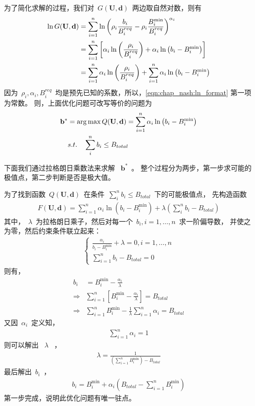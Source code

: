 为了简化求解的过程，我们对~$G(\mathbf{U}, \mathbf{d})$~两边取自然对数，则有
\begin{align}
    \ln G(\mathbf{U}, \mathbf{d}) &= \sum_{i=1}^{n} \ln \left(\rho_i \frac{b_i}{B_i^{req}} - \rho_i \frac{B_i^{\min}}{B_i^{req}} \right)^{\alpha_i} \notag \notag\\
    &= \sum_{i=1}^n \left[ \alpha_i \ln \left( \frac{\rho_i}{B_i^{req}} \right) + \alpha_i \ln \left( b_i - B_i^{\min} \right) \right] \notag\\
    &= \sum_{i=1}^n \alpha_i \ln \left( \frac{\rho_i}{B_i^{req}} \right) + \sum_{i=1}^n  \alpha_i \ln \left(b_i - B_i^{\min} \right) 
    \label{eqn:chap_nash:ln_format}
\end{align}
因为~$\rho_i, \alpha_i, B_i^{req}$~均是预先已知的系数，所以，\eqref{eqn:chap_nash:ln_format} 第一项为常数。
则，上面优化问题可改写等价的问题为
\begin{align}
    \mathbf{b}^* &= \arg \max Q(\mathbf{U}, \mathbf{d}) = \sum_{i=1}^n  \alpha_i \ln \left( b_i - B_i^{\min} \right) \notag\\
    & s.t. \quad \sum_i^n b_i \le B_{total} 
\end{align}

下面我们通过拉格朗日乘数法来求解 ~$\mathbf{b}^*$~。
整个过程分为两步，第一步求可能的极值点，第二步判断是否是极大值。

为了找到函数~$Q(\mathbf{U}, \mathbf{d})$~在条件~$\sum_i^n b_i \le B_{total}$~下的可能极值点，
先构造函数
\begin{align*}
    F(\mathbf{U}, \mathbf{d}) =  \sum_{i=1}^n  \alpha_i \ln \left(b_i - B_i^{\min} \right)
    + \lambda(\sum_i^n b_i - B_{total} ) 
\end{align*}
其中，~$\lambda$~为拉格朗日乘子，然后对每一个~$b_i, i=1,\dots,n$~求一阶偏导数，
并使之为零，然后约束条件联立起来：
\begin{align}   
    \begin{cases}
        \displaystyle\frac{\alpha_i}{b_i - B_i^{\min}} + \lambda = 0, i=1,\dots, n  \\
        \displaystyle \sum_{i=1}^n b_i - B_{total} = 0
    \end{cases}
\end{align}
则有，
\begin{align*}
    b_i &= B_i^{\min} - \frac{\alpha_i}{\lambda} \\
    \Rightarrow & \sum_{i=1}^n \left[ B_i^{\min} - \frac{\alpha_i}{\lambda} \right] = B_{total} \\
    \Rightarrow & \sum_{i=1}^n B_i^{\min} - \frac{1}{\lambda} \sum_{i=1}^n \alpha_i = B_{total}
\end{align*}
又因~$\alpha_i$~定义知，
\begin{align*}
    \sum_{i=1}^n \alpha_i = 1
\end{align*}
则可以解出 ~$\lambda$~ ，
\begin{align*}
    \lambda = \frac{1}{(\sum_{i=1}^n B_i^{\min} )  -B_{total} }
\end{align*}
最后解出~$b_i$~，
\begin{align}
    b_i = B_i^{\min} + \alpha_i \left( B_{total} - \sum_{i=1}^n B_i^{\min}  \right)
    \label{eqn:chap_nash:res_allocation}
\end{align}
第一步完成，说明此优化问题有唯一驻点。

